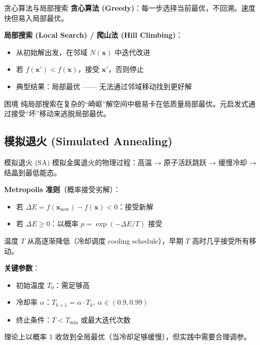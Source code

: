 \documentclass[11pt, aspectratio=169, svgnames, table, fontset=fandol]{ctexbeamer}
\begin{document}
\begin{frame}{贪心算法与局部搜索}
  \textbf{贪心算法 (Greedy)}：每一步选择当前最优，不回溯。速度快但易入局部最优。

  \vspace{4pt}
  \textbf{局部搜索 (Local Search) / 爬山法 (Hill Climbing)}：
  \begin{itemize}
    \item 从初始解出发，在邻域 $N(\bm{x})$ 中迭代改进
    \item 若 $f(\bm{x}') < f(\bm{x})$，接受 $\bm{x}'$，否则停止
    \item 典型结果：局部最优 —— 无法通过邻域移动找到更好解
  \end{itemize}

  \vspace{6pt}
  \begin{alertblock}{困境}
    纯局部搜索在复杂的“崎岖”解空间中极易卡在低质量局部最优。元启发式通过接受“坏”移动来逃脱局部最优。
  \end{alertblock}
\end{frame}

\subsection{模拟退火 (Simulated Annealing)}

\begin{frame}{模拟退火 (SA)}
  模拟金属退火的物理过程：高温 → 原子活跃跳跃 → 缓慢冷却 → 结晶到最低能态。

  \vspace{4pt}
  \textbf{Metropolis 准则}（概率接受劣解）：
  \begin{itemize}
    \item 若 $\Delta E = f(\bm{x}_{\text{new}}) - f(\bm{x}) < 0$：接受新解
    \item 若 $\Delta E \geq 0$：以概率 $p = \exp(-\Delta E / T)$ 接受
  \end{itemize}
  温度 $T$ 从高逐渐降低（冷却调度 cooling schedule），早期 $T$ 高时几乎接受所有移动。

  \vspace{6pt}
  \textbf{关键参数}：
  \begin{itemize}
    \item 初始温度 $T_0$：需足够高
    \item 冷却率 $\alpha$：$T_{k+1} = \alpha \cdot T_k,\ \alpha \in (0.9, 0.99)$
    \item 终止条件：$T < T_{\min}$ 或最大迭代次数
  \end{itemize}

  理论上以概率 1 收敛到全局最优（当冷却足够缓慢），但实践中需要合理调参。
\end{frame}
\end{document}
